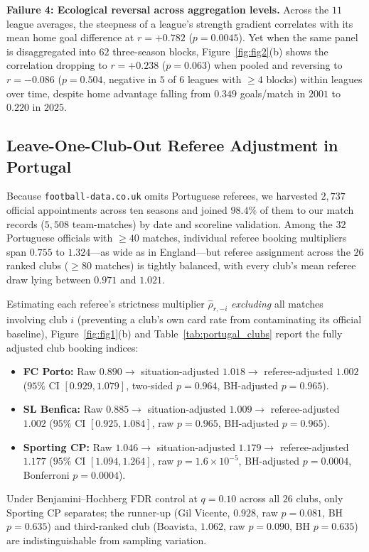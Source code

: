 \documentclass[10pt,twocolumn]{article}
\begin{document}
\textbf{Failure 4: Ecological reversal across aggregation levels.} Across the $11$ league averages, the steepness of a league's strength gradient correlates with its mean home goal difference at $r = +0.782$ ($p = 0.0045$). Yet when the same panel is disaggregated into $62$ three-season blocks, Figure~\ref{fig:fig2}(b) shows the correlation dropping to $r = +0.238$ ($p = 0.063$) when pooled and reversing to $r = -0.086$ ($p = 0.504$, negative in $5$ of $6$ leagues with $\ge 4$ blocks) within leagues over time, despite home advantage falling from $0.349$ goals/match in $2001$ to $0.220$ in $2025$.

\subsection{Leave-One-Club-Out Referee Adjustment in Portugal}
Because \texttt{football-data.co.uk} omits Portuguese referees, we harvested $2,737$ official appointments across ten seasons and joined $98.4\%$ of them to our match records ($5,508$ team-matches) by date and scoreline validation. Among the $32$ Portuguese officials with $\ge 40$ matches, individual referee booking multipliers span $0.755$ to $1.324$---as wide as in England---but referee assignment across the $26$ ranked clubs ($\ge 80$ matches) is tightly balanced, with every club's mean referee draw lying between $0.971$ and $1.021$.

Estimating each referee's strictness multiplier $\hat{\rho}_{r,-i}$ \emph{excluding} all matches involving club $i$ (preventing a club's own card rate from contaminating its official baseline), Figure~\ref{fig:fig1}(b) and Table~\ref{tab:portugal_clubs} report the fully adjusted club booking indices:
\begin{itemize}
  \item \textbf{FC Porto:} Raw $0.890 \to$ situation-adjusted $1.018 \to$ referee-adjusted $\mathbf{1.002}$ ($95\%$ CI $[0.929, 1.079]$, two-sided $p = 0.964$, BH-adjusted $p = 0.965$).
  \item \textbf{SL Benfica:} Raw $0.885 \to$ situation-adjusted $1.009 \to$ referee-adjusted $\mathbf{1.002}$ ($95\%$ CI $[0.925, 1.084]$, raw $p = 0.965$, BH-adjusted $p = 0.965$).
  \item \textbf{Sporting CP:} Raw $1.046 \to$ situation-adjusted $1.179 \to$ referee-adjusted $\mathbf{1.177}$ ($95\%$ CI $[1.094, 1.264]$, raw $p = 1.6\times 10^{-5}$, BH-adjusted $p = 0.0004$, Bonferroni $p = 0.0004$).
\end{itemize}
Under Benjamini--Hochberg FDR control at $q = 0.10$ across all $26$ clubs, only Sporting CP separates; the runner-up (Gil Vicente, $0.928$, raw $p = 0.081$, BH $p = 0.635$) and third-ranked club (Boavista, $1.062$, raw $p = 0.090$, BH $p = 0.635$) are indistinguishable from sampling variation.
\end{document}
